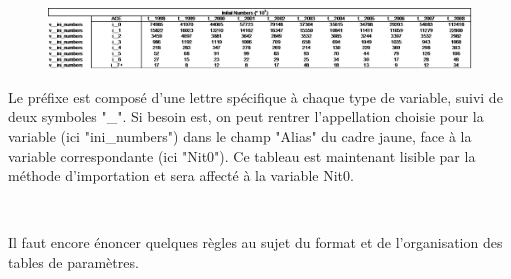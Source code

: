 \documentclass[12pt, colorinlistoftodos]{article}
\newenvironment{not used}[1]{%
    \longtable{%
        |>{\centering$\displaystyle}A{#1}{1}<{$}%
        |}\hline\ignorespaces}{%
    \endlongtable\ignorespacesafterend}
\begin{document}
\begin{figure}[h!]
    \begin{center}
    \includegraphics[width = \textwidth]{figures/param/stock4.png}
    \end{center}
    \label{fig:cancel}
\end{figure}
        
Le préfixe est composé d'une lettre spécifique à chaque type de variable, suivi de deux symboles "\_". Si besoin est, on peut rentrer l'appellation choisie pour la variable (ici "ini\_numbers") dans le champ "Alias" du cadre jaune, face à la variable correspondante (ici "Nit0"). Ce tableau est maintenant lisible par la méthode d'importation et sera affecté à la variable Nit0.

\par~\par

Il faut encore énoncer quelques règles au sujet du format et de l'organisation des tables de paramètres.  
\end{document}
